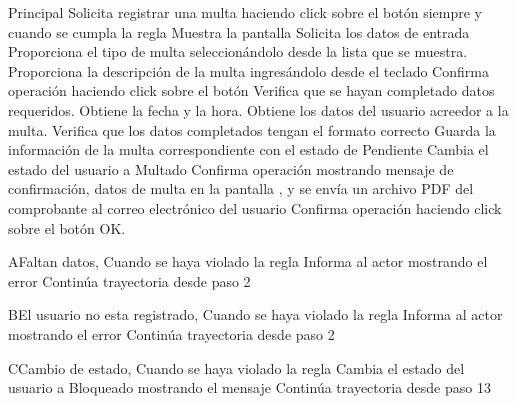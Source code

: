 	\begin{UCtrayectoria}{Principal}
		\UCpaso[\UCactor] Solicita registrar una multa haciendo click sobre el botón  siempre y cuando se cumpla la regla 
		\UCpaso [\UCactor] Muestra la pantalla 
		\UCpaso Solicita los datos de entrada
		\UCpaso[\UCactor] Proporciona el tipo de multa seleccionándolo desde la lista que se muestra.
		\UCpaso[\UCactor] Proporciona la descripción de la multa ingres\'andolo desde el teclado
		\UCpaso[\UCactor] Confirma operación haciendo click sobre el botón 
		\UCpaso Verifica que se hayan completado datos requeridos.
		\UCpaso Obtiene la fecha y la hora.
		\UCpaso Obtiene los datos del usuario acreedor a la multa.
		\UCpaso Verifica que los datos completados tengan el formato correcto 
		\UCpaso Guarda la información de la multa correspondiente con el estado de Pendiente	
		\UCpaso Cambia el estado del usuario a Multado 
		\UCpaso Confirma operación mostrando mensaje de confirmación, datos de multa  en la pantalla , y se envía un archivo PDF del comprobante  al correo electrónico del usuario 
		\UCpaso[\UCactor] Confirma operación haciendo click sobre el botón OK.	
\end{UCtrayectoria}

		\begin{UCtrayectoriaA}{A}{Faltan datos,
Cuando se haya violado la regla }
	\UCpaso Informa al actor mostrando el error  
	\UCpaso Continúa trayectoria desde paso 2 
\end{UCtrayectoriaA}

\begin{UCtrayectoriaA}{B}{El usuario no esta registrado,
Cuando se haya violado la regla }
	\UCpaso Informa al actor mostrando el error 
	\UCpaso Continúa trayectoria desde paso 2 
\end{UCtrayectoriaA}

\begin{UCtrayectoriaA}{C}{Cambio de estado,
Cuando se haya violado la regla }
	\UCpaso Cambia el estado del usuario a Bloqueado mostrando el mensaje  
	\UCpaso Continúa trayectoria desde paso 13 
\end{UCtrayectoriaA}


